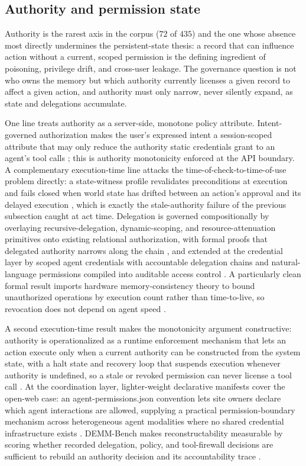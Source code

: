 \subsection{Authority and permission state}

Authority is the rarest axis in the corpus ($72$ of $435$) and the one whose absence most directly undermines the persistent-state thesis: a record that can influence action without a current, scoped permission is the defining ingredient of poisoning, privilege drift, and cross-user leakage. The governance question is not who owns the memory but which authority currently licenses a given record to affect a given action, and authority must only narrow, never silently expand, as state and delegations accumulate.

One line treats authority as a server-side, monotone policy attribute. Intent-governed authorization makes the user's expressed intent a session-scoped attribute that may only reduce the authority static credentials grant to an agent's tool calls \citep{zhu2026intentgovernedauth}; this is authority monotonicity enforced at the API boundary. A complementary execution-time line attacks the time-of-check-to-time-of-use problem directly: a state-witness profile revalidates preconditions at execution and fails closed when world state has drifted between an action's approval and its delayed execution \citep{zhu2026openport}, which is exactly the stale-authority failure of the previous subsection caught at act time. Delegation is governed compositionally by overlaying recursive-delegation, dynamic-scoping, and resource-attenuation primitives onto existing relational authorization, with formal proofs that delegated authority narrows along the chain \citep{ibrahim2026overlaygovernance}, and extended at the credential layer by scoped agent credentials with accountable delegation chains and natural-language permissions compiled into auditable access control \citep{south2025authenticateddelegation}. A particularly clean formal result imports hardware memory-consistency theory to bound unauthorized operations by execution count rather than time-to-live, so revocation does not depend on agent speed \citep{parakhin2026bureaucracy}.

A second execution-time result makes the monotonicity argument constructive: authority is operationalized as a runtime enforcement mechanism that lets an action execute only when a current authority can be constructed from the system state, with a halt state and recovery loop that suspends execution whenever authority is undefined, so a stale or revoked permission can never license a tool call \citep{fernandez2026authority}. At the coordination layer, lighter-weight declarative manifests cover the open-web case: an agent-permissions.json convention lets site owners declare which agent interactions are allowed, supplying a practical permission-boundary mechanism across heterogeneous agent modalities where no shared credential infrastructure exists \citep{marro2025permissions}. DEMM-Bench makes reconstructability measurable by scoring whether recorded delegation, policy, and tool-firewall decisions are sufficient to rebuild an authority decision and its accountability trace \citep{solozobov2026demm}.

